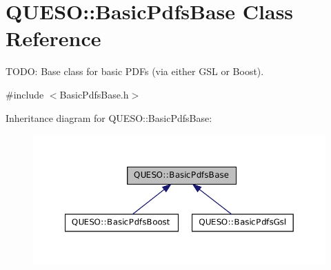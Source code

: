 \hypertarget{class_q_u_e_s_o_1_1_basic_pdfs_base}{\section{Q\-U\-E\-S\-O\-:\-:Basic\-Pdfs\-Base Class Reference}
\label{class_q_u_e_s_o_1_1_basic_pdfs_base}
}


T\-O\-D\-O\-: Base class for basic P\-D\-Fs (via either G\-S\-L or Boost).  




{\ttfamily \#include $<$Basic\-Pdfs\-Base.\-h$>$}



Inheritance diagram for Q\-U\-E\-S\-O\-:\-:Basic\-Pdfs\-Base\-:
\nopagebreak
\begin{figure}[H]
\begin{center}
\leavevmode
\includegraphics[width=350pt]{class_q_u_e_s_o_1_1_basic_pdfs_base__inherit__graph}
\end{center}
\end{figure}
